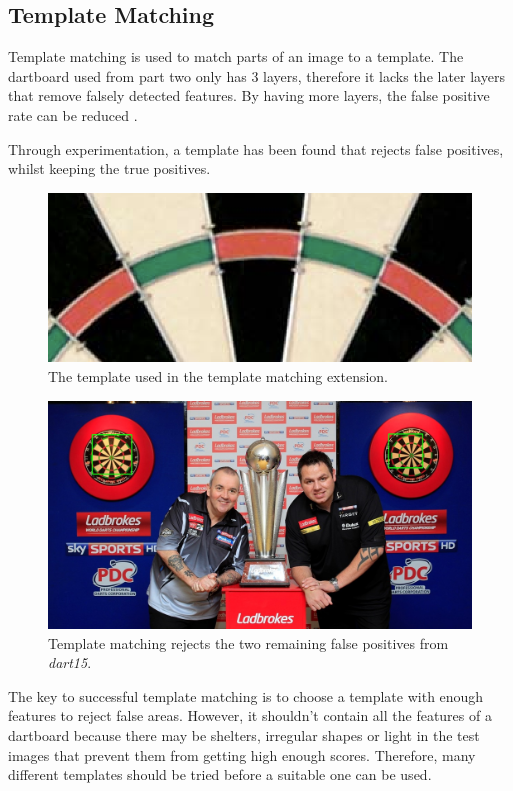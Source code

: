 \documentclass[conference]{IEEEtran}
\begin{document}
\subsection{Template Matching}
Template matching is used to  match parts of an image to a template. The dartboard used from part two only has 3 layers, therefore it lacks the later layers that remove falsely detected features. By having more layers, the false positive rate can be reduced \cite{lewis1995fast}. \par

Through experimentation, a template has been found that rejects false positives, whilst keeping the true positives.  
\par 
\begin{figure}[!htb]
\begin{center}
\includegraphics[width=0.8\linewidth]{images/template.png}
\caption{The template used in the template matching extension. }
\label{default}
\end{center}
\end{figure}

\par 
\begin{figure}[!htb]
\begin{center}
\includegraphics[width=0.8\linewidth]{images/template_merit.jpg}
\caption{Template matching rejects the two remaining false positives from \emph{dart15}.}
\label{default}
\end{center}
\end{figure}
The key to successful template matching is to choose a template with enough features to reject false areas. However, it shouldn't contain all the features of a dartboard because there may be shelters, irregular shapes or light in the test images that prevent them from getting high enough scores. Therefore, many different templates should be tried before a suitable one can be used.
\end{document}
